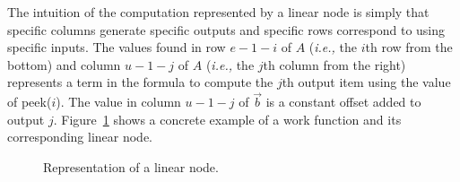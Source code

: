 The intuition of the computation represented by a linear node is
simply that specific columns generate specific outputs and specific
rows correspond to using specific inputs.  The values found in row
$e-1-i$ of $A$ ({\it i.e.,} the $i$th row from the bottom) and 
column $u-1-j$ of $A$ ({\it i.e.,} the $j$th column from the right) 
represents a term in the formula to compute the $j$th output item using 
the value of peek($i$). The value in column $u-1-j$ of 
$\vec{b}$ is a constant offset added to output $j$.
Figure~\ref{fig:linear-node-example} shows a concrete example
of a work function and its corresponding linear node.

\begin{figure}
\center
\epsfxsize=2.9in
\vspace{-8pt}
\caption{Representation of a linear node.}
\vspace{-4pt}
\makeline
\vspace{-8pt}
\label{fig:linear-node-example}
\end{figure}

